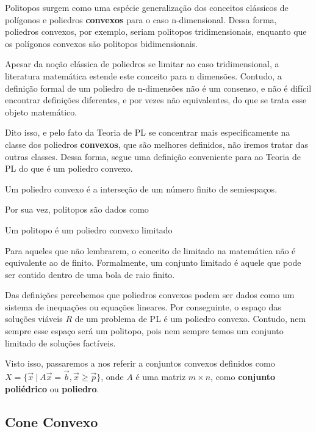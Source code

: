 Politopos surgem como uma espécie generalização dos conceitos clássicos de polígonos e poliedros \textbf{convexos} para o caso n-dimensional. Dessa forma, poliedros convexos, por exemplo, seriam politopos tridimensionais, enquanto que os polígonos convexos são politopos bidimensionais.

Apesar da noção clássica de poliedros se limitar ao caso tridimensional, a literatura matemática estende este conceito para n dimensões. Contudo, a definição formal de um poliedro de n-dimensões não é um consenso, e não é difícil encontrar definições diferentes, e por vezes não equivalentes, do que se trata esse objeto matemático.

Dito isso, e pelo fato da Teoria de PL se concentrar mais especificamente na classe dos poliedros \textbf{convexos}, que são melhores definidos, não iremos tratar das outras classes. Dessa forma, segue uma definição conveniente para ao Teoria de PL do que é um poliedro convexo.

\begin{def:poliedro convexo}
	Um poliedro convexo é a interseção de um número finito de semiespaços.
\end{def:poliedro convexo}

Por sua vez, politopos são dados como

\begin{def:politopo}
	Um politopo é um poliedro convexo limitado
\end{def:politopo}

Para aqueles que não lembrarem, o conceito de limitado na matemática não é equivalente ao de finito. Formalmente, um conjunto limitado é aquele que pode ser contido dentro de uma bola de raio finito.

Das definições percebemos que poliedros convexos podem ser dados como um sistema de inequações ou equações lineares. Por conseguinte, o espaço das soluções viáveis $R$ de um problema de PL é um poliedro convexo. Contudo, nem sempre esse espaço será um politopo, pois nem sempre temos um conjunto limitado de soluções factíveis.

Visto isso, passaremos a nos referir a conjuntos convexos definidos como $X = \{\vec{x}\ |\ A\vec{x} = \vec{b}, \vec{x} \geq \vec{p}\}$, onde $A$ é uma matriz $m \times n$, como \textbf{conjunto poliédrico} ou \textbf{poliedro}.

\subsection{Cone Convexo}

